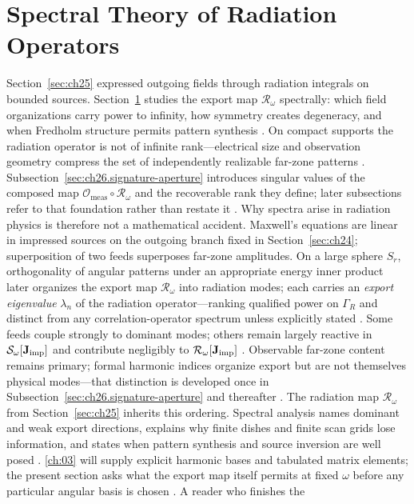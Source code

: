 \section{Spectral Theory of Radiation Operators}
\label{sec:ch26}
Section~\ref{sec:ch25} expressed outgoing fields through radiation integrals on bounded sources.
Section~\ref{sec:ch26} studies the export map $\mathcal{R}_\omega$ spectrally: which field
organizations carry power to infinity, how symmetry creates degeneracy, and when Fredholm
structure permits pattern synthesis \cite{harrington2001,reed1950}. On compact supports the
radiation operator is not of infinite rank---electrical size and observation geometry compress the
set of independently realizable far-zone patterns \cite{chu1948,stratton1941}.
Subsection~\ref{sec:ch26.signature-aperture} introduces singular values of the composed map
$\mathcal{O}_{\mathrm{meas}}\circ\mathcal{R}_\omega$ and the recoverable rank they define; later
subsections refer to that foundation rather than restate it \cite{hansen1988}.
Why spectra arise in radiation physics is therefore not a mathematical accident. Maxwell's
equations are linear in impressed sources on the outgoing branch fixed in Section~\ref{sec:ch24};
superposition of two feeds superposes far-zone amplitudes. On a large sphere $S_r$, orthogonality
of angular patterns under an appropriate energy inner product later organizes the export map
$\mathcal{R}_\omega$ into radiation modes; each carries an \emph{export eigenvalue}
$\lambda_n$ of the radiation operator---ranking qualified power on $\Gamma_R$ and distinct from
any correlation-operator spectrum unless explicitly stated \cite{stratton1941}. Some feeds couple strongly to dominant
modes; others remain largely reactive in $\mathcal{S}_\omega[\mathbf{J}_{\mathrm{imp}}]$ and contribute negligibly
to $\mathcal{R}_\omega[\mathbf{J}_{\mathrm{imp}}]$ \cite{poynting1884,stratton1941}.
Observable far-zone content remains primary; formal harmonic indices organize export but are not
themselves physical modes---that distinction is developed once in
Subsection~\ref{sec:ch26.signature-aperture} and thereafter
\cite{stratton1941}.
The radiation map $\mathcal{R}_\omega$ from Section~\ref{sec:ch25} inherits this ordering.
Spectral analysis names dominant and weak export directions, explains why finite dishes and
finite scan grids lose information, and states when pattern synthesis and source inversion are
well posed \cite{stratton1941}. \ref{ch:03} will supply explicit harmonic bases and tabulated
matrix elements; the present section asks what the export map itself permits at fixed $\omega$
before any particular angular basis is chosen \cite{stratton1941}. A reader who finishes the

